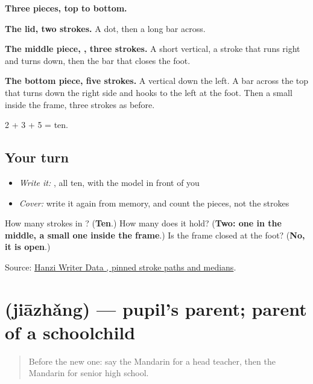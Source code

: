 \begin{quote}
\end{quote}

\textbf{Three pieces, top to bottom.}

\textbf{The lid, two strokes.} A dot, then a long bar across.

\textbf{The middle piece, , three strokes.} A short vertical, a stroke that runs right and turns down, then the bar that closes the foot.

\textbf{The bottom piece, five strokes.} A vertical down the left. A bar across the top that turns down the right side and hooks to the left at the foot. Then a small  inside the frame, three strokes as before.

2 + 3 + 5 = ten.

\subsection*{Your turn}
\begin{itemize}
\raggedright
  \item \emph{Write it:} , all ten, with the model in front of you
  \item \emph{Cover:} write it again from memory, and count the pieces, not the strokes
\end{itemize}

\begin{tcolorbox}[breakable,colback=teal!4,colframe=teal!35!black,title={Before you move on}]
How many strokes in ? (\textbf{Ten}.) How many  does it hold? (\textbf{Two: one in the middle, a small one inside the frame}.) Is the frame closed at the foot? (\textbf{No, it is open}.)

Source: \href{https://raw.githubusercontent.com/chanind/hanzi-writer-data/68d10a4b21150cae5e1ebbd223eed289cf32d90c/data/\%E9\%AB\%98.json}{Hanzi Writer Data , pinned stroke paths and medians}.
\end{tcolorbox}
\section[\texorpdfstring{\zh{家长} (jiāzhǎng)}{家长 (jiāzhǎng)}]{ (jiāzhǎng) — pupil's parent; parent of a schoolchild}

\label{lesson:ZH-C248-jiazhang}



\begin{quote}
Before the new one: say the Mandarin for a head teacher, then the Mandarin for senior high school.
\end{quote}

